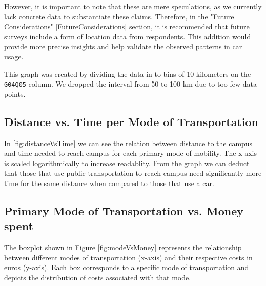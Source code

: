 However, it is important to note that these are mere speculations, as we currently lack concrete data to substantiate these claims. Therefore, in the "Future Considerations" \ref{FutureConsiderations} section, it is recommended that future surveys include a form of location data from respondents. This addition would provide more precise insights and help validate the observed patterns in car usage.

This graph was created by dividing the data in to bins of 10 kilometers on the \texttt{G04Q05} column. We dropped the interval from 50 to 100 km due to too few data points.

\subsection{Distance vs. Time per Mode of Transportation}

In \ref{fig:distanceVsTime} we can see the relation between distance to the campus and time needed to reach campus for each primary mode of mobility. The x-axis is scaled logarithmically to increase readablity. From the graph we can deduct that those that use public transportation to reach campus need significantly more time for the same distance when compared to those that use a car.

\subsection{Primary Mode of Transportation vs. Money spent}

The boxplot shown in Figure \ref{fig:modeVsMoney} represents the relationship between different modes of transportation (x-axis) and their respective costs in euros (y-axis). Each box corresponds to a specific mode of transportation and depicts the distribution of costs associated with that mode.

